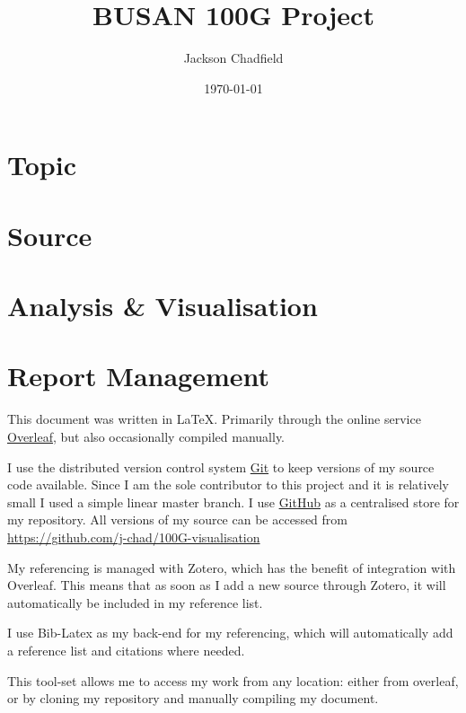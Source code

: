 \documentclass{article}
\title{BUSAN 100G Project}
\author{Jackson Chadfield}
\date{\today}
\begin{document}
\maketitle

\section{Topic}

\section{Source}

\section{Analysis \& Visualisation}

\section{Report Management}
This document was written in \LaTeX. Primarily through the online service \href{https://www.overleaf.com}{Overleaf}, but also occasionally compiled manually.

I use the distributed version control system \href{https://git-scm.com/}{Git} to keep versions of my source code available. Since I am the sole contributor to this project and it is relatively small I used a simple linear master branch. I use \href{https://github.com/}{GitHub} as a centralised store for my repository. All versions of my source can be accessed from \url{https://github.com/j-chad/100G-visualisation}

My referencing is managed with Zotero, which has the benefit of integration with Overleaf. This means that as soon as I add a new source through Zotero, it will automatically be included in my reference list. 

I use Bib-Latex as my back-end for my referencing, which will automatically add a reference list and citations where needed.

This tool-set allows me to access my work from any location: either from overleaf, or by cloning my repository and manually compiling my document.
\end{document}
